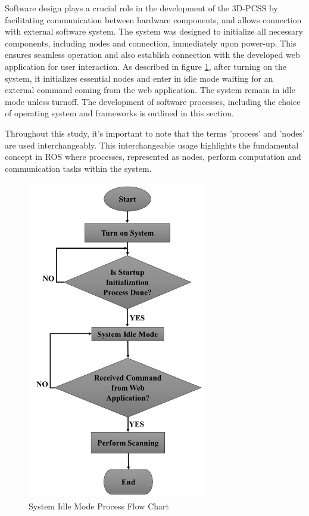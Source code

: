 Software design plays a crucial role in the development of the 3D-PCSS by facilitating communication between hardware components, and allows connection with external software system. The system was designed to initialize all necessary components, including nodes and connection, immediately upon power-up. This ensures seamless operation and also establish connection with the developed web application for user interaction. As described in figure \ref{ch3:fig:software_system_process}, after turning on the system, it initializes essential nodes and enter in idle mode waiting for an external command coming from the web application. The system remain in idle mode unless turnoff. The development of software processes, including the choice of operating system and frameworks is outlined in this section.

Throughout this study, it's important to note that the terms 'process' and 'nodes' are used interchangeably. This interchangeable usage highlights the fundamental concept in ROS where processes, represented as nodes, perform computation and communication tasks within the system.

\begin{figure}[H]
	\centering
	\includegraphics[width=0.7\textwidth, height=0.7\textheight]{Figures/software_system_process}
	\caption{System Idle Mode Process Flow Chart}
	\label{ch3:fig:software_system_process}
\end{figure}

